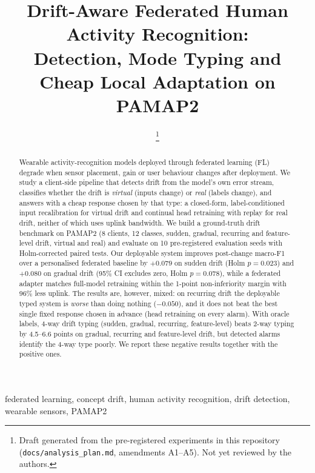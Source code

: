 \documentclass[journal]{IEEEtran}
\begin{document}
\title{Drift-Aware Federated Human Activity Recognition:\\ Detection, Mode Typing and Cheap Local Adaptation on PAMAP2}

\author{%
\thanks{Draft generated from the pre-registered experiments in this repository (\texttt{docs/analysis\_plan.md}, amendments A1--A5). Not yet reviewed by the authors.}}

\maketitle

\begin{abstract}
Wearable activity-recognition models deployed through federated learning (FL) degrade when sensor placement, gain or user behaviour changes after deployment. We study a client-side pipeline that detects drift from the model's own error stream, classifies whether the drift is \emph{virtual} (inputs change) or \emph{real} (labels change), and answers with a cheap response chosen by that type: a closed-form, label-conditioned input recalibration for virtual drift and continual head retraining with replay for real drift, neither of which uses uplink bandwidth. We build a ground-truth drift benchmark on PAMAP2 (8 clients, 12 classes, sudden, gradual, recurring and feature-level drift, virtual and real) and evaluate on 10 pre-registered evaluation seeds with Holm-corrected paired tests. Our deployable system improves post-change macro-F1 over a personalised federated baseline by $+0.079$ on sudden drift (Holm $p=0.023$) and $+0.080$ on gradual drift (95\% CI excludes zero, Holm $p=0.078$), while a federated adapter matches full-model retraining within the 1-point non-inferiority margin with 96\% less uplink. The results are, however, mixed: on recurring drift the deployable typed system is \emph{worse} than doing nothing ($-0.050$), and it does not beat the best single fixed response chosen in advance (head retraining on every alarm). With oracle labels, 4-way drift typing (sudden, gradual, recurring, feature-level) beats 2-way typing by 4.5--6.6 points on gradual, recurring and feature-level drift, but detected alarms identify the 4-way type poorly. We report these negative results together with the positive ones.
\end{abstract}

\begin{IEEEkeywords}
federated learning, concept drift, human activity recognition, drift detection, wearable sensors, PAMAP2
\end{IEEEkeywords}
\end{document}
